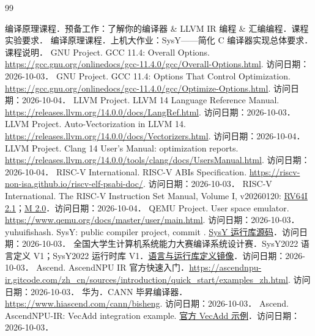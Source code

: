 \begingroup
\small
\begin{thebibliography}{99}
{}
 编译原理课程．预备工作：了解你的编译器 \& LLVM IR 编程 \& 汇编编程．课程实验要求．
 编译原理课程．上机大作业：SysY——简化 C 编译器实现总体要求．课程说明．
 GNU Project. GCC 11.4: Overall Options. \url{https://gcc.gnu.org/onlinedocs/gcc-11.4.0/gcc/Overall-Options.html}. 访问日期：2026-10-03．
 GNU Project. GCC 11.4: Options That Control Optimization. \url{https://gcc.gnu.org/onlinedocs/gcc-11.4.0/gcc/Optimize-Options.html}. 访问日期：2026-10-04．
 LLVM Project. LLVM 14 Language Reference Manual. \url{https://releases.llvm.org/14.0.0/docs/LangRef.html}. 访问日期：2026-10-03．
 LLVM Project. Auto-Vectorization in LLVM 14. \url{https://releases.llvm.org/14.0.0/docs/Vectorizers.html}. 访问日期：2026-10-04．
 LLVM Project. Clang 14 User's Manual: optimization reports. \url{https://releases.llvm.org/14.0.0/tools/clang/docs/UsersManual.html}. 访问日期：2026-10-04．
 RISC-V International. RISC-V ABIs Specification. \url{https://riscv-non-isa.github.io/riscv-elf-psabi-doc/}. 访问日期：2026-10-03．
 RISC-V International. The RISC-V Instruction Set Manual, Volume I, v20260120: \href{https://docs.riscv.org/reference/isa/v20260120/unpriv/rv64.html}{RV64I 2.1}；\href{https://docs.riscv.org/reference/isa/v20260120/unpriv/m-st-ext.html}{M 2.0}．访问日期：2026-10-04．
 QEMU Project. User space emulator. \url{https://www.qemu.org/docs/master/user/main.html}. 访问日期：2026-10-03．
 yuhuifishash. SysY: public compiler project, commit . \href{https://github.com/yuhuifishash/SysY/tree/d3639373ddc894dd0d20b307d0bf1fe92b6f685b}{SysY 运行库源码}．访问日期：2026-10-03．
 全国大学生计算机系统能力大赛编译系统设计赛．SysY2022 语言定义 V1；SysY2022 运行时库 V1．\href{https://github.com/william-dan/SysY2022-ARMv7-Compiler/tree/7e7778d1546b850dd720ef30fff528c18737d183}{语言与运行库定义镜像}．访问日期：2026-10-03．
 Ascend. AscendNPU IR 官方快速入门．\url{https://ascendnpu-ir.gitcode.com/zh_cn/sources/introduction/quick_start/examples_zh.html}. 访问日期：2026-10-03．
 华为．CANN 毕昇编译器．\url{https://www.hiascend.com/cann/bisheng}. 访问日期：2026-10-03．
 Ascend. AscendNPU-IR: VecAdd integration example. \href{https://github.com/Ascend/AscendNPU-IR/tree/37c6ebc33d1789500014e6a7b2b62164b3cb566b/bishengir/test/Integration/HIVM/VecAdd}{官方 VecAdd 示例}．访问日期：2026-10-03．

\end{thebibliography}
